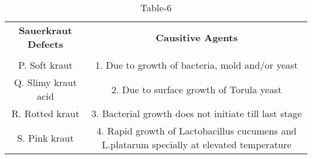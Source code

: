 \begin{table}[htbp]
  \centering
  \caption{Table-6}
  \label{tab:tables/table6.tex}
  \begin{tabular}{cc}
  \textbf{Sauerkraut Defects} & \textbf{Causitive Agents} \\ \\
    P. Soft kraut & 1. Due to growth of bacteria, mold and/or yeast \\
    Q. Slimy kraut acid & 2. Due to surface growth of Torula yeast\\
    R. Rotted kraut & 3. Bacterial growth does not initiate till last stage \\
    S. Pink kraut & 4. Rapid growth of Lactobacillus cucumens and L.platarum specially at elevated temperature \\
  \end{tabular}
\end{table}